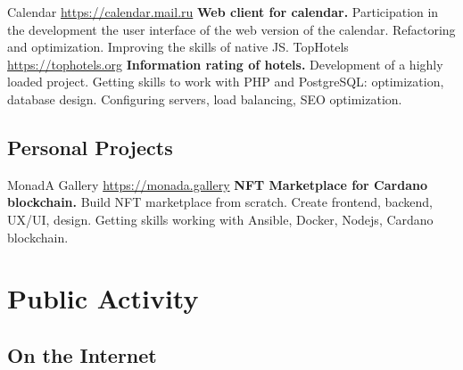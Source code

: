 \documentclass[11pt,a4paper]{moderncv}
\begin{document}
  \cvline
    {Calendar}
    {\url{https://calendar.mail.ru}\newline{}
    \textbf{Web client for calendar.}\newline{}
    Participation in the development the user interface of the web version of the calendar.\newline{}
    Refactoring and optimization. Improving the skills of native JS.}
  \cvline
    {TopHotels}
    {\url{https://tophotels.org}\newline{}
    \textbf{Information rating of hotels.}\newline{}
    Development of a highly loaded project.
    Getting skills to work with PHP and PostgreSQL: optimization, database design.
    Configuring servers, load balancing, SEO optimization.}

\newpage

  \subsection{Personal Projects}
  \cvline
    {MonadA Gallery}
    {\url{https://monada.gallery}\newline{}
    \textbf{NFT Marketplace for Cardano blockchain.}\newline{}
    Build NFT marketplace from scratch. Create frontend, backend, UX/UI, design. Getting skills working with Ansible, Docker, Nodejs, Cardano blockchain.}

\section{Public Activity}
  \subsection{On the Internet}
\end{document}
